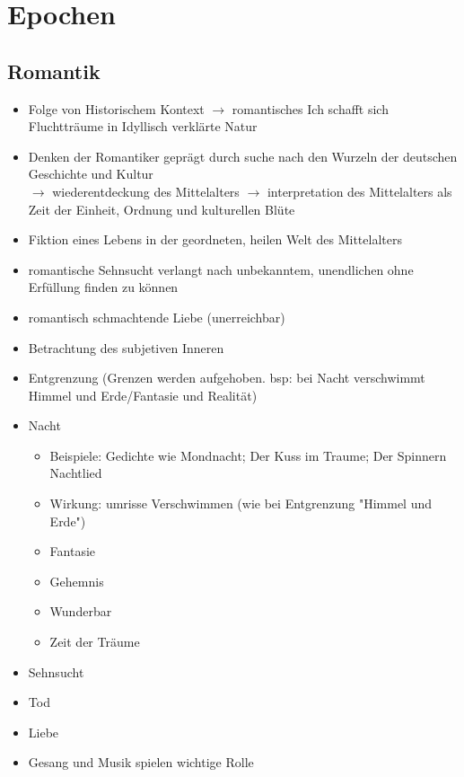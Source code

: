 

%
%

\section{Epochen}

\subsection{Romantik}

\begin{itemize}
    \item Folge von Historischem Kontext $\rightarrow$ romantisches Ich schafft sich Fluchtträume in Idyllisch verklärte Natur
    \item Denken der Romantiker geprägt durch suche nach den Wurzeln der deutschen Geschichte und Kultur \\ 
        $\rightarrow$ wiederentdeckung des Mittelalters
        $\rightarrow$ interpretation des Mittelalters als Zeit der Einheit, Ordnung und kulturellen Blüte
    \item Fiktion eines Lebens in der geordneten, heilen Welt des Mittelalters
    \item romantische Sehnsucht verlangt nach unbekanntem, unendlichen ohne Erfüllung finden zu können
    \item romantisch schmachtende Liebe (unerreichbar)
    \item Betrachtung des subjetiven Inneren
    \item Entgrenzung (Grenzen werden aufgehoben. bsp: bei Nacht verschwimmt Himmel und Erde/Fantasie und Realität)
\end{itemize}

\begin{itemize}
    \item Nacht 
        \begin{itemize}
            \item Beispiele: Gedichte wie Mondnacht; Der Kuss im Traume; Der Spinnern Nachtlied
            \item Wirkung: umrisse Verschwimmen (wie bei Entgrenzung "Himmel und Erde")
            \item Fantasie
            \item Gehemnis
            \item Wunderbar
            \item Zeit der Träume
        \end{itemize}
    \item Sehnsucht
    \item Tod
    \item Liebe
    \item Gesang und Musik spielen wichtige Rolle
\end{itemize}

